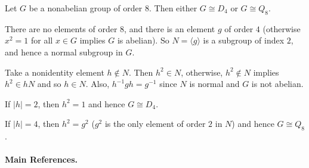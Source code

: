 \begin{theorem} \label{thm-nonabelian-order-8}
	Let $G$ be a nonabelian group of order $8$. Then either $G \cong D_4$ or $G\cong Q_8$.
\end{theorem}
\begin{sketch}
	There are no elements of order $8$, and there is an element $g$ of order $4$ (otherwise $x^2=1$ for all $x\in G$ implies $G$ is abelian). So $N=\langle g\rangle$ is a subgroup of index $2$, and hence a normal subgroup in $G$. 
	
	Take a nonidentity element $h\not\in N$. Then $h^2\in N$, otherwise,  $h^2 \not\in N$ implies $h^2\in hN$ and so $h\in N$. Also, $h^{-1}gh = g^{-1}$ since $N$ is normal and $G$ is not abelian.
	
	If $|h| = 2$, then $h^2= 1$ and hence $G\cong D_4$.
	
	If $|h| = 4$, then $h^2 = g^2$ ($g^2$ is the only element of order $2$ in $N$) and hence $G\cong Q_8$.
\end{sketch}

\paragraph{Main References.} \cite{DummitFoote2004,Artin1991,Hungerford1974}

